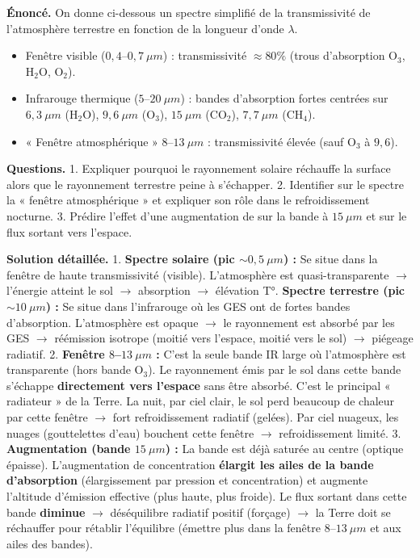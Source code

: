 \documentclass[11pt]{article}
\begin{document}
\begin{exoresolu}
\textbf{Énoncé.} On donne ci-dessous un spectre simplifié de la transmissivité de l'atmosphère terrestre en fonction de la longueur d'onde $\lambda$.
\begin{itemize}
    \item Fenêtre visible ($0,4$--$0,7\ \mu m$) : transmissivité $\approx 80\%$ (trous d'absorption O$_3$, H$_2$O, O$_2$).
    \item Infrarouge thermique ($5$--$20\ \mu m$) : bandes d'absorption fortes centrées sur $6,3\ \mu m$ (H$_2$O), $9,6\ \mu m$ (O$_3$), $15\ \mu m$ (CO$_2$), $7,7\ \mu m$ (CH$_4$).
    \item « Fenêtre atmosphérique » $8$--$13\ \mu m$ : transmissivité élevée (sauf O$_3$ à $9,6$).
\end{itemize}
\textbf{Questions.}
1. Expliquer pourquoi le rayonnement solaire réchauffe la surface alors que le rayonnement terrestre peine à s'échapper.
2. Identifier sur le spectre la « fenêtre atmosphérique » et expliquer son rôle dans le refroidissement nocturne.
3. Prédire l'effet d'une augmentation de  sur la bande à $15\ \mu m$ et sur le flux sortant vers l'espace.

\tcblower
\textbf{Solution détaillée.}
1. \textbf{Spectre solaire (pic $\sim 0,5\ \mu m$) :} Se situe dans la fenêtre de haute transmissivité (visible). L'atmosphère est quasi-transparente $\rightarrow$ l'énergie atteint le sol $\rightarrow$ absorption $\rightarrow$ élévation T°.
\textbf{Spectre terrestre (pic $\sim 10\ \mu m$) :} Se situe dans l'infrarouge où les GES ont de fortes bandes d'absorption. L'atmosphère est opaque $\rightarrow$ le rayonnement est absorbé par les GES $\rightarrow$ réémission isotrope (moitié vers l'espace, moitié vers le sol) $\rightarrow$ piégeage radiatif.
2. \textbf{Fenêtre $8$--$13\ \mu m$ :} C'est la seule bande IR large où l'atmosphère est transparente (hors bande O$_3$). Le rayonnement émis par le sol dans cette bande s'échappe \textbf{directement vers l'espace} sans être absorbé. C'est le principal « radiateur » de la Terre. La nuit, par ciel clair, le sol perd beaucoup de chaleur par cette fenêtre $\rightarrow$ fort refroidissement radiatif (gelées). Par ciel nuageux, les nuages (gouttelettes d'eau) bouchent cette fenêtre $\rightarrow$ refroidissement limité.
3. \textbf{Augmentation  (bande $15\ \mu m$) :} La bande est déjà saturée au centre (optique épaisse). L'augmentation de concentration \textbf{élargit les ailes de la bande d'absorption} (élargissement par pression et concentration) et augmente l'altitude d'émission effective (plus haute, plus froide). Le flux sortant dans cette bande \textbf{diminue} $\rightarrow$ déséquilibre radiatif positif (forçage) $\rightarrow$ la Terre doit se réchauffer pour rétablir l'équilibre (émettre plus dans la fenêtre $8$--$13\ \mu m$ et aux ailes des bandes).
\end{exoresolu}
\end{document}
